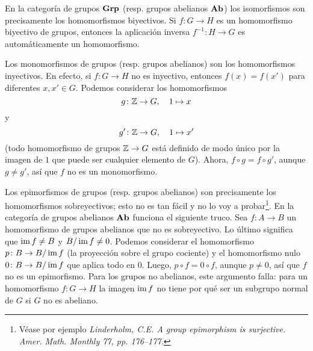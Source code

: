 \documentclass{article}
\numberwithin{equation}{section}
\theoremstyle{definition}
\begin{document}
\begin{ejemplo}
  En la categoría de grupos $\text{\bf Grp}$ (resp. grupos abelianos $\text{\bf Ab}$)
  los isomorfismos son precisamente los homomorfismos biyectivos. Si
  $f\colon G\to H$ es un homomorfismo biyectivo de grupos, entonces la
  aplicación inversa $f^{-1}\colon H\to G$ es automáticamente un homomorfismo.

  Los monomorfismos de grupos (resp. grupos abelianos) son los homomorfismos
  inyectivos. En efecto, si $f\colon G\to H$ no es inyectivo, entonces
  $f (x) = f (x')$ para diferentes $x,x'\in G$. Podemos considerar los
  homomorfismos
  $$g\colon \mathbb{Z} \to G, \quad 1\mapsto x$$
  y
  $$g'\colon \mathbb{Z} \to G, \quad 1\mapsto x'$$
  (todo homomorfismo de grupos $\mathbb{Z}\to G$ está definido de modo único por la
  imagen de $1$ que puede ser cualquier elemento de $G$). Ahora,
  $f\circ g = f\circ g'$, aunque $g\ne g'$, así que $f$ no es un monomorfismo.

  Los epimorfismos de grupos (resp. grupos abelianos) son precisamente los
  homomorfismos sobreyectivos; esto no es tan fácil y no lo voy a
  probar\footnote{Véase por ejemplo \emph{Linderholm, C.E. A group epimorphism
      is surjective. Amer. Math. Monthly 77, pp. 176–177.}}. En la categoría de
  grupos abelianos $\text{\bf Ab}$ funciona el siguiente truco. Sea
  $f\colon A\to B$ un homomorfismo de grupos abelianos que no es
  sobreyectivo. Lo último significa que $\operatorname{im} f \ne B$ y $B/\operatorname{im} f \ne 0$. Podemos
  considerar el homomorfismo $p\colon B\to B/\operatorname{im} f$ (la proyección sobre el
  grupo cociente) y el homomorfismo nulo $0\colon B\to B/\operatorname{im} f$ que aplica todo
  en $0$. Luego, $p\circ f = 0\circ f$, aunque $p\ne 0$, así que $f$ no es un
  epimorfismo. Para los grupos no abelianos, este argumento falla: para un
  homomorfismo $f\colon G\to H$ la imagen $\operatorname{im} f$ no tiene por qué ser un
  subgrupo normal de $G$ si $G$ no es abeliano.
\end{ejemplo}
\end{document}
